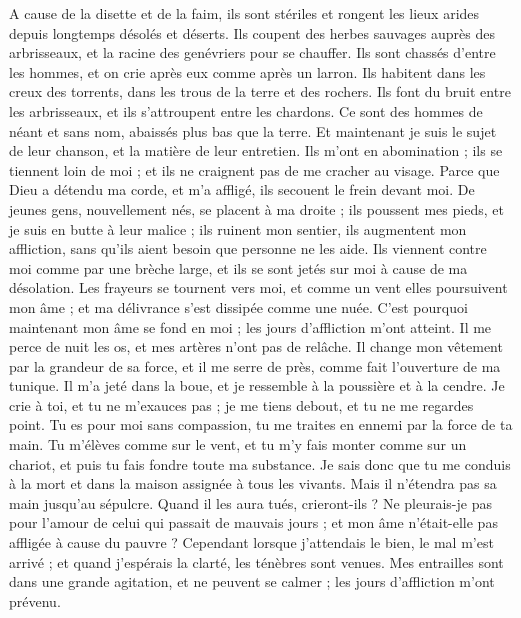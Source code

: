 \begin{multicols}{2}
A cause de la disette et de la faim, ils sont stériles et rongent les lieux arides depuis longtemps désolés et déserts. 
Ils coupent des herbes sauvages auprès des arbrisseaux, et la racine des genévriers pour se chauffer. 
Ils sont chassés d'entre les hommes, et on crie après eux comme après un larron. 
Ils habitent dans les creux des torrents, dans les trous de la terre et des rochers.
Ils font du bruit entre les arbrisseaux, et ils s'attroupent entre les chardons. 
Ce sont des hommes de néant et sans nom, abaissés plus bas que la terre. 
Et maintenant je suis le sujet de leur chanson, et la matière de leur entretien.
Ils m'ont en abomination ; ils se tiennent loin de moi ; et ils ne craignent pas de me cracher au visage. 
Parce que Dieu a détendu ma corde, et m'a affligé, ils secouent le frein devant moi.
De jeunes gens, nouvellement nés, se placent à ma droite ; ils poussent mes pieds, et je suis en butte à leur malice ;
ils ruinent mon sentier, ils augmentent mon affliction, sans qu'ils aient besoin que personne ne les aide.
Ils viennent contre moi comme par une brèche large, et ils se sont jetés sur moi à cause de ma désolation. 
Les frayeurs se tournent vers moi, et comme un vent elles poursuivent mon âme ; et ma délivrance s'est dissipée comme une nuée.
C'est pourquoi maintenant mon âme se fond en moi ; les jours d'affliction m'ont atteint. 
Il me perce de nuit les os, et mes artères n'ont pas de relâche. 
Il change mon vêtement par la grandeur de sa force, et il me serre de près, comme fait l'ouverture de ma tunique.
Il m'a jeté dans la boue, et je ressemble à la poussière et à la cendre. 
Je crie à toi, et tu ne m'exauces pas ; je me tiens debout, et tu ne me regardes point. 
Tu es pour moi sans compassion, tu me traites en ennemi par la force de ta main. 
Tu m'élèves comme sur le vent, et tu m'y fais monter comme sur un chariot, et puis tu fais fondre toute ma substance. 
Je sais donc que tu me conduis à la mort et dans la maison assignée à tous les vivants.
Mais il n'étendra pas sa main jusqu'au sépulcre. Quand il les aura tués, crieront-ils ? 
Ne pleurais-je pas pour l'amour de celui qui passait de mauvais jours ; et mon âme n'était-elle pas affligée à cause du pauvre ?
Cependant lorsque j'attendais le bien, le mal m'est arrivé ; et quand j'espérais la clarté, les ténèbres sont venues. 
Mes entrailles sont dans une grande agitation, et ne peuvent se calmer ; les jours d'affliction m'ont prévenu. 

\end{multicols}
